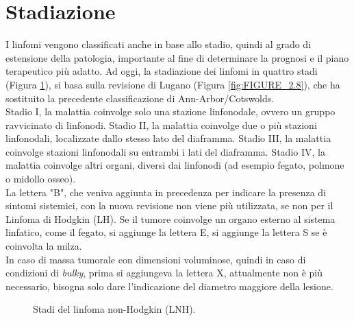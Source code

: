 \section{Stadiazione}
I linfomi vengono classificati anche in base allo stadio, quindi al grado di estensione della patologia, 
importante al fine di determinare la prognosi e il piano terapeutico più adatto. 
Ad oggi, la stadiazione dei linfomi in quattro stadi (Figura \ref{fig:FIGURE_2.14}), si basa sulla revisione di 
Lugano (Figura \ref{fig:FIGURE_2.8}), che ha sostituito la precedente classificazione di Ann-Arbor/Cotswolds\cite{AIOM}.\\
Stadio I, la malattia coinvolge solo una stazione linfonodale, ovvero un gruppo ravvicinato di linfonodi. 
Stadio II, la malattia coinvolge due o più stazioni linfonodali, localizzate dallo stesso lato del diaframma. 
Stadio III, la malattia coinvolge stazioni linfonodali su entrambi i lati del diaframma. 
Stadio IV, la malattia coinvolge altri organi, diversi dai linfonodi (ad esempio fegato, polmone o midollo osseo)\cite{LLS}.\\
La lettera "B", che veniva aggiunta in precedenza per indicare la presenza di sintomi sistemici, 
con la nuova revisione non viene più utilizzata, se non per il Linfoma di Hodgkin (LH)\cite{AIOM}.
Se il tumore coinvolge un organo esterno al sistema linfatico, come il fegato, si aggiunge la lettera E, 
si aggiunge la lettera S se è coinvolta la milza\cite{ISTGENT}.\\
In caso di massa tumorale con dimensioni voluminose, quindi in caso di condizioni di \emph{bulky}, 
prima si aggiungeva la lettera X, attualmente non è più necessario, 
bisogna solo dare l’indicazione del diametro maggiore della lesione\cite{AIOM}.

\begin{figure}[H]
    \begin{center}
    \vspace{-3mm}
    \end{center}
    \caption{Stadi del linfoma non-Hodgkin (LNH).
    \cite{LLS}}
    \label{fig:FIGURE_2.14}
\end{figure}

